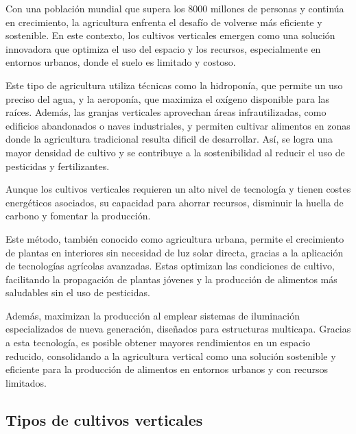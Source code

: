 Con una población mundial que supera los 8000 millones de personas y continúa en crecimiento, la agricultura enfrenta el desafío de volverse más eficiente y sostenible. En este contexto, los cultivos verticales emergen como una solución innovadora que optimiza el uso del espacio y los recursos, especialmente en entornos urbanos, donde el suelo es limitado y costoso.

Este tipo de agricultura utiliza técnicas como la hidroponía, que permite un uso preciso del agua, y la aeroponía, que maximiza el oxígeno disponible para las raíces. Además, las granjas verticales aprovechan áreas infrautilizadas, como edificios abandonados o naves industriales, y permiten cultivar alimentos en zonas donde la agricultura tradicional resulta dificil de desarrollar. Así, se logra una mayor densidad de cultivo y se contribuye a la sostenibilidad al reducir el uso de pesticidas y fertilizantes.

Aunque los cultivos verticales requieren un alto nivel de tecnología y tienen costes energéticos asociados, su capacidad para ahorrar recursos, disminuir la huella de carbono y fomentar la producción.

Este método, también conocido como agricultura urbana, permite el crecimiento de plantas en interiores sin necesidad de luz solar directa, gracias a la aplicación de tecnologías agrícolas avanzadas. Estas optimizan las condiciones de cultivo, facilitando la propagación de plantas jóvenes y la producción de alimentos más saludables sin el uso de pesticidas.

Además, maximizan la producción al emplear sistemas de iluminación especializados de nueva generación, diseñados para estructuras multicapa. Gracias a esta tecnología, es posible obtener mayores rendimientos en un espacio reducido, consolidando a la agricultura vertical como una solución sostenible y eficiente para la producción de alimentos en entornos urbanos y con recursos limitados.

\subsection{Tipos de cultivos verticales}



